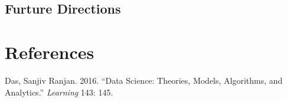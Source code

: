 \documentclass[
  letterpaper,
  DIV=11,
  numbers=noendperiod]{scrreport}
\newlength{\cslhangindent}
\newlength{\cslentryspacingunit} %
\newenvironment{CSLReferences}[2] %
 {%
  \setlength{\parindent}{0pt}
  \ifodd #1
  \let\oldpar\par
  \def\par{\hangindent=\cslhangindent\oldpar}
  \fi
  \setlength{\parskip}{#2\cslentryspacingunit}
 }%
 {}
\begin{document}
\hypertarget{furture-directions}{%
\section{Furture Directions}\label{furture-directions}}


\hypertarget{references}{%
\chapter*{References}\label{references}}

\hypertarget{refs}{}
\begin{CSLReferences}{1}{0}
\leavevmode{}%
Das, Sanjiv Ranjan. 2016. {``Data Science: Theories, Models, Algorithms,
and Analytics.''} \emph{Learning} 143: 145.

\end{CSLReferences}
\end{document}
